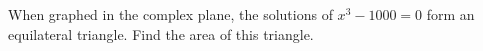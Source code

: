 When graphed in the complex plane, the solutions of $x^3-1000=0$ form an equilateral triangle. Find the area of this triangle.
